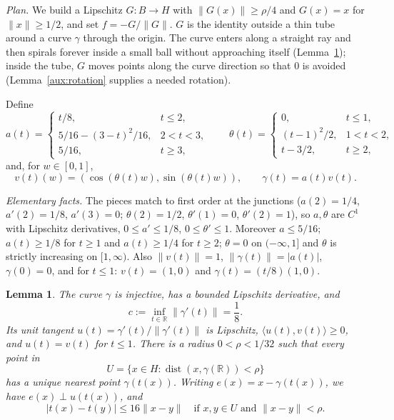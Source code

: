 \documentclass[11pt]{article}
\newcommand{\R}{\mathbb R}
\newcommand{\norm}[1]{\lVert #1\rVert}
\newcommand{\ip}[2]{\langle #1,#2\rangle}
\DeclareMathOperator{\dist}{dist}
\newtheorem{lemma}[theorem]{Lemma}
\theoremstyle{definition}
\numberwithin{equation}{section}
\begin{document}
\emph{Plan.} We build a Lipschitz $G:B\to H$ with
$\norm{G(x)}\ge\rho/4$ and $G(x)=x$ for $\norm{x}\ge1/2$, and set
$f=-G/\norm{G}$. $G$ is the identity outside a thin tube around a curve
$\gamma$ through the origin. The curve enters along a straight ray and
then spirals forever inside a small ball without approaching itself
(Lemma~\ref{aux:tube}); inside the tube, $G$ moves points along the
curve direction so that $0$ is avoided (Lemma~\ref{aux:rotation}
supplies a needed rotation).

Define
\[
 a(t)=
 \begin{cases}
 t/8,&t\le2,\\
 5/16-(3-t)^2/16,&2<t<3,\\
 5/16,&t\ge3,
 \end{cases}
 \qquad
 \theta(t)=
 \begin{cases}
 0,&t\le1,\\
 (t-1)^2/2,&1<t<2,\\
 t-3/2,&t\ge2,
 \end{cases}
\]
and, for $w\in[0,1]$,
\[
 v(t)(w)=(\cos(\theta(t)w),\sin(\theta(t)w)),\qquad\gamma(t)=a(t)v(t).
\]

\emph{Elementary facts.} The pieces match to first order at the
junctions ($a(2)=1/4$, $a'(2)=1/8$, $a'(3)=0$; $\theta(2)=1/2$,
$\theta'(1)=0$, $\theta'(2)=1$), so $a,\theta$ are $C^1$ with
Lipschitz derivatives, $0\le a'\le1/8$, $0\le\theta'\le1$. Moreover
$a\le5/16$; $a(t)\ge1/8$ for $t\ge1$ and $a(t)\ge1/4$ for $t\ge2$;
$\theta=0$ on $(-\infty,1]$ and $\theta$ is strictly increasing on
$[1,\infty)$. Also $\norm{v(t)}=1$, $\norm{\gamma(t)}=|a(t)|$,
$\gamma(0)=0$, and for $t\le1$: $v(t)=(1,0)$ and
$\gamma(t)=(t/8)(1,0)$.

\begin{lemma}\label{aux:tube}
The curve $\gamma$ is injective, has a bounded Lipschitz derivative, and
\[
 c:=\inf_{t\in\R}\norm{\gamma'(t)}=\frac18.
\]
Its unit tangent $u(t)=\gamma'(t)/\norm{\gamma'(t)}$ is Lipschitz,
$\ip{u(t)}{v(t)}\ge0$, and $u(t)=v(t)$ for $t\le1$.
There is a radius $0<\rho<1/32$ such that every point in
\[
 U=\{x\in H:\dist(x,\gamma(\R))<\rho\}
\]
has a unique nearest point $\gamma(t(x))$. Writing
$e(x)=x-\gamma(t(x))$, we have $e(x)\perp u(t(x))$, and
\begin{equation}\label{aux:parameter}
 |t(x)-t(y)|\le16\norm{x-y}
 \quad\text{if }x,y\in U\text{ and }\norm{x-y}<\rho.
\end{equation}
\end{lemma}
\end{document}
